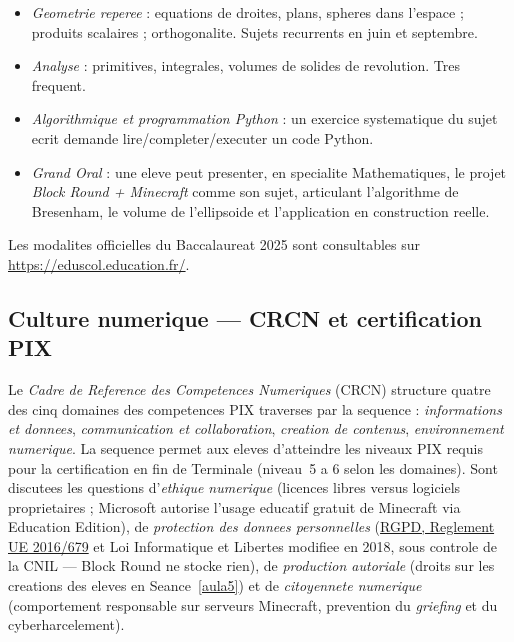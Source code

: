 \documentclass[12pt,a4paper]{scrartcl}
\begin{document}
\begin{itemize}[leftmargin=1.3em,itemsep=0.15em,topsep=0.3em]
  \item \emph{Geometrie reperee} : equations de droites, plans, spheres dans l'espace ; produits scalaires ; orthogonalite. Sujets recurrents en juin et septembre.
  \item \emph{Analyse} : primitives, integrales, volumes de solides de revolution. Tres frequent.
  \item \emph{Algorithmique et programmation Python} : un exercice systematique du sujet ecrit demande lire/completer/executer un code Python.
  \item \emph{Grand Oral} : un\textperiodcentered e eleve peut presenter, en specialite Mathematiques, le projet \emph{Block Round + Minecraft} comme son sujet, articulant l'algorithme de Bresenham, le volume de l'ellipsoide et l'application en construction reelle.
\end{itemize}

Les modalites officielles du Baccalaureat 2025 sont consultables sur \url{https://eduscol.education.fr/}.

\subsection{Culture numerique --- CRCN et certification PIX}

Le \emph{Cadre de Reference des Competences Numeriques} (CRCN) structure quatre des cinq domaines des competences PIX traverses par la sequence : \emph{informations et donnees}, \emph{communication et collaboration}, \emph{creation de contenus}, \emph{environnement numerique}. La sequence permet aux eleves d'atteindre les niveaux PIX requis pour la certification en fin de Terminale (niveau~5 a 6 selon les domaines). Sont discutees les questions d'\emph{ethique numerique} (licences libres versus logiciels proprietaires ; Microsoft autorise l'usage educatif gratuit de Minecraft via Education Edition), de \emph{protection des donnees personnelles} (\href{https://www.cnil.fr/fr/reglement-europeen-protection-donnees}{RGPD, Reglement UE 2016/679} et Loi Informatique et Libertes modifiee en 2018, sous controle de la CNIL --- Block Round ne stocke rien), de \emph{production autoriale} (droits sur les creations des eleves en Seance~\ref{aula5}) et de \emph{citoyennete numerique} (comportement responsable sur serveurs Minecraft, prevention du \emph{griefing} et du cyberharcelement).

\end{document}
